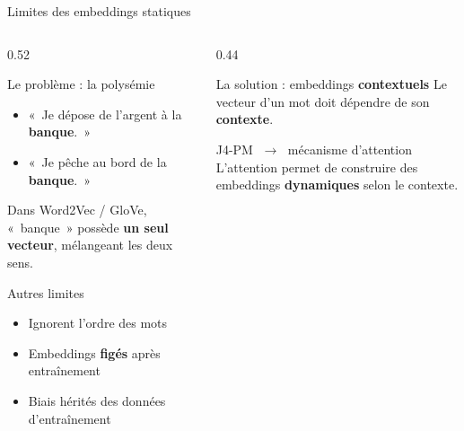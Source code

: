 \documentclass[aspectratio=169, 10pt]{beamer}
\begin{document}
\begin{frame}{Limites des embeddings statiques}
  \begin{columns}[T]
    \begin{column}{0.52\textwidth}
      \begin{alertblock}{Le problème : la polysémie}
        \begin{itemize}
          \item «~Je dépose de l'argent à la \textbf{banque}.~»
          \item «~Je pêche au bord de la \textbf{banque}.~»
        \end{itemize}
        \vspace{4pt}
        Dans Word2Vec / GloVe, «~banque~» possède
        \textbf{un seul vecteur}, mélangeant les deux sens.
      \end{alertblock}
      \smallskip
      \begin{alertblock}{Autres limites}
        \begin{itemize}
          \item Ignorent l'ordre des mots
          \item Embeddings \textbf{figés} après entraînement
          \item Biais hérités des données d'entraînement
        \end{itemize}
      \end{alertblock}
    \end{column}
    \begin{column}{0.44\textwidth}
      \begin{block}{La solution : embeddings \textbf{contextuels}}
        Le vecteur d'un mot doit dépendre de son \textbf{contexte}.
        \vspace{4pt}
        \begin{center}
        \end{center}
      \end{block}
      \vspace{2pt}
      \begin{exampleblock}{J4-PM $\;\to\;$ mécanisme d'attention}
        L'attention permet de construire des embeddings
        \textbf{dynamiques} selon le contexte.
      \end{exampleblock}
    \end{column}
  \end{columns}
\end{frame}
\end{document}
